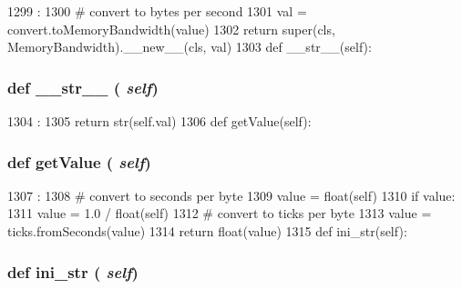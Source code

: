 \begin{DoxyCode}
1299                            :
1300         # convert to bytes per second
1301         val = convert.toMemoryBandwidth(value)
1302         return super(cls, MemoryBandwidth).__new__(cls, val)
1303 
    def __str__(self):
\end{DoxyCode}
\hypertarget{classm5_1_1params_1_1MemoryBandwidth_aa7a4b9bc0941308e362738503137460e}{
\subsubsection[{\_\-\_\-str\_\-\_\-}]{\setlength{\rightskip}{0pt plus 5cm}def \_\-\_\-str\_\-\_\- ( {\em self})}}
\label{classm5_1_1params_1_1MemoryBandwidth_aa7a4b9bc0941308e362738503137460e}



\begin{DoxyCode}
1304                      :
1305         return str(self.val)
1306 
    def getValue(self):
\end{DoxyCode}
\hypertarget{classm5_1_1params_1_1MemoryBandwidth_acc340fbd4335fa34f9d57fb454b28ed0}{
\subsubsection[{getValue}]{\setlength{\rightskip}{0pt plus 5cm}def getValue ( {\em self})}}
\label{classm5_1_1params_1_1MemoryBandwidth_acc340fbd4335fa34f9d57fb454b28ed0}



\begin{DoxyCode}
1307                       :
1308         # convert to seconds per byte
1309         value = float(self)
1310         if value:
1311             value = 1.0 / float(self)
1312         # convert to ticks per byte
1313         value = ticks.fromSeconds(value)
1314         return float(value)
1315 
    def ini_str(self):
\end{DoxyCode}
\hypertarget{classm5_1_1params_1_1MemoryBandwidth_a33ebe6cd32bcbd15465fc28b9d94bf82}{
\subsubsection[{ini\_\-str}]{\setlength{\rightskip}{0pt plus 5cm}def ini\_\-str ( {\em self})}}
\label{classm5_1_1params_1_1MemoryBandwidth_a33ebe6cd32bcbd15465fc28b9d94bf82}


